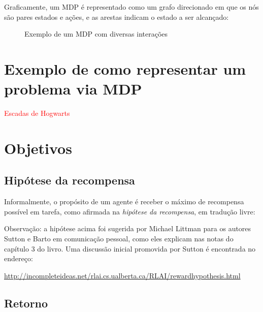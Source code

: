 \documentclass{article}
\begin{document}
        Graficamente, um MDP é representado como um grafo direcionado em que os nós são pares estados e ações, e as arestas indicam o estado a ser alcançado:
    
        \begin{figure}[ht]
            \centering
            \mdpbig
            \caption{Exemplo de um MDP com diversas interações}
            \label{diag:mdp-big}
        \end{figure}
        
    \section{Exemplo de como representar um problema via MDP}
    
        \textcolor{red}{Escadas de Hogwarts}
    
    \section{Objetivos}
    
        \subsection{Hipótese da recompensa}
    
            Informalmente, o propósito de um agente é receber o máximo de recompensa possível em tarefa, como afirmada na \emph{hipótese da recompensa}, em tradução livre:
            \begin{center}
            \noindent{}%
            \end{center}
            
            Observação: a hipótese acima foi sugerida por Michael Littman para os autores Sutton e Barto em comunicação pessoal, como eles explicam nas notas do capítulo 3 do livro. Uma discussão inicial promovida por Sutton é encontrada no endereço:
            
            \url{http://incompleteideas.net/rlai.cs.ualberta.ca/RLAI/rewardhypothesis.html}
        
        \subsection{Retorno}
\end{document}
